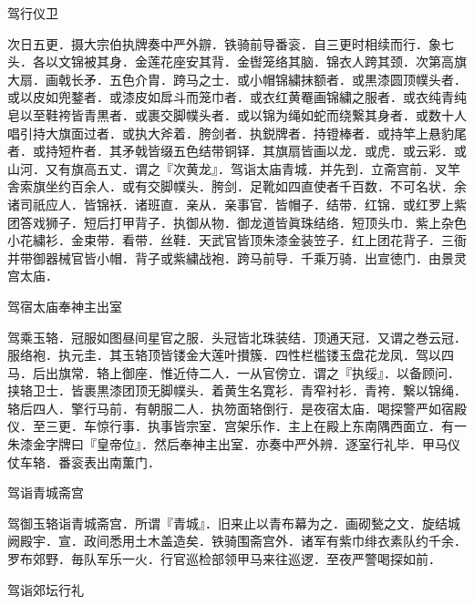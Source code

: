 \documentclass[]{article}
\begin{document}
驾行仪卫

次日五更．摄大宗伯执牌奏中严外辧．铁骑前导番衮．自三更时相续而行．象七头．各以文锦被其身．金莲花座安其背．金辔笼络其脑．锦衣人跨其颈．次第高旗大扇．画戟长矛．五色介胄．跨马之士．或小帽锦繍抹额者．或黒漆圆顶幞头者．或以皮如兜鍪者．或漆皮如戽斗而笼巾者．或衣红黄罨画锦繍之服者．或衣纯青纯皂以至鞋袴皆青黒者．或裹交脚幞头者．或以锦为绳如蛇而绕繋其身者．或数十人唱引持大旗面过者．或执大斧着．胯剑者．执鋭牌者．持镫棒者．或持竿上悬豹尾者．或持短杵者．其矛戟皆缀五色结带铜铎．其旗扇皆画以龙．或虎．或云彩．或山河．又有旗高五丈．谓之『次黄龙』．驾诣太庙青城．并先到．立斋宫前．叉竿舎索旗坐约百余人．或有交脚幞头．胯剑．足靴如四直使者千百数．不可名状．余诸司祇应人．皆锦袄．诸班直．亲从．亲事官．皆帽子．结带．红锦．或红罗上紫团答戏狮子．短后打甲背子．执御从物．御龙道皆眞珠结络．短顶头巾．紫上杂色小花繍衫．金束带．看带．丝鞋．天武官皆顶朱漆金装笠子．红上团花背子．三衙并带御器械官皆小帽．背子或紫繍战袍．跨马前导．千乘万骑．出宣徳门．由景灵宫太庙．

驾宿太庙奉神主出室

驾乘玉辂．冠服如图昼间星官之服．头冠皆北珠装结．顶通天冠．又谓之巻云冠．服络袍．执元圭．其玉辂顶皆镂金大莲叶攅簇．四性栏槛镂玉盘花龙凤．驾以四马．后出旗常．辂上御座．惟近侍二人．一从官傍立．谓之『执绥』．以备顾问．挟辂卫士．皆裹黒漆团顶无脚幞头．着黄生名寛衫．青窄衬衫．青袴．繋以锦绳．辂后四人．擎行马前．有朝服二人．执笏面辂倒行．是夜宿太庙．喝探警严如宿殿仪．至三更．车惊行事．执事皆宗室．宫架乐作．主上在殿上东南隅西面立．有一朱漆金字牌曰『皇帝位』．然后奉神主出室．亦奏中严外辨．逐室行礼毕．甲马仪仗车辂．番衮表出南薫门．

驾诣青城斋宫

驾御玉辂诣青城斋宫．所谓『青城』．旧来止以青布幕为之．画砌甃之文．旋结城阙殿宇．宣．政间悉用土木盖造矣．铁骑围斋宫外．诸军有紫巾绯衣素队约千余．罗布郊野．毎队军乐一火．行官巡检部领甲马来往巡逻．至夜严警喝探如前．

驾诣郊坛行礼
\end{document}
